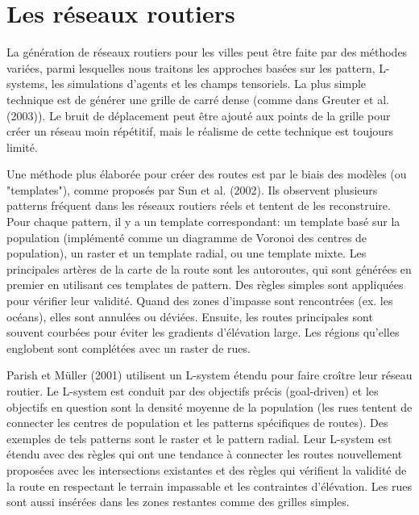 \documentclass[11pt]{report}
\begin{document}
\section{Les réseaux routiers}

La génération de réseaux routiers pour les villes peut être faite par des méthodes variées, parmi lesquelles nous traitons les approches basées sur les pattern, L-systems, les simulations d'agents et les champs tensoriels. La plus simple technique est de générer une grille de carré dense (comme dans Greuter et al. (2003)). Le bruit de déplacement peut être ajouté aux points de la grille pour créer un réseau moin répétitif, mais le réalisme de cette technique est toujours limité. \newline

Une méthode plus élaborée pour créer des routes est par le biais des modèles (ou "templates"), comme proposés par Sun et al. (2002). Ils observent plusieurs patterns fréquent dans les réseaux routiers réels et tentent de les reconstruire. Pour chaque pattern, il y a un template correspondant: un template basé sur la population (implémenté comme un diagramme de Voronoi des centres de population), un raster et un template radial, ou une template mixte. Les principales artères de la carte de la route sont les autoroutes, qui sont générées en premier en utilisant ces templates de pattern. Des règles simples sont appliquées pour vérifier leur validité. Quand des zones d'impasse sont rencontrées (ex. les océans), elles sont annulées ou déviées. Ensuite, les routes principales sont souvent courbées pour éviter les gradients d'élévation large. Les régions qu'elles englobent sont complétées avec un raster de rues. \newline

Parish et Müller (2001) utilisent un L-system étendu pour faire croître leur réseau routier. Le L-system est conduit par des objectifs précis (goal-driven) et les objectifs en question sont la densité moyenne de la population (les rues tentent de connecter les centres de population et les patterns spécifiques de routes). Des exemples de tels patterns sont le raster et le pattern radial. Leur L-system est étendu avec des règles qui ont une tendance à connecter les routes nouvellement proposées avec les intersections existantes et des règles qui vérifient la validité de la route en respectant le terrain impassable et les contraintes d'élévation. Les rues sont aussi insérées dans les zones restantes comme des grilles simples. \newline
\end{document}
